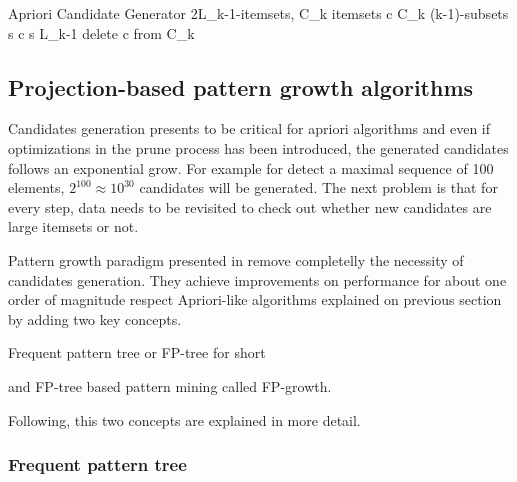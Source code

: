 \begin{pseudocode}{Apriori Candidate Generator 2}{L_{k-1}-itemsets, C_{k}}
\label{pc:apriori_candidate_generator2}
    \FORALL itemsets \quad c \in C_{k} \DO
    \BEGIN
        \FORALL (k-1)-subsets \quad s \in c \DO
        \BEGIN
            \IF s \not\in  L_{k-1} \THEN
                delete \quad c \quad from \quad C_{k}\\
        \END
    \END
\end{pseudocode}


\subsection{Projection-based pattern growth
algorithms}\label{ss:projection_based}

Candidates generation presents to be critical for apriori algorithms and even if
optimizations in the prune process has been introduced, the generated candidates
follows an exponential grow. For example for detect a maximal sequence of 100
elements, $2^{100} \approx 10^{30}$ candidates will be generated. The next
problem is that for every step, data needs to be revisited to check out whether 
new candidates are large itemsets or not. 

Pattern growth paradigm presented in \cite{han2000mining1} remove
completelly the necessity of candidates generation. They achieve improvements on
performance for about one order of magnitude respect Apriori-like algorithms
explained on previous section by adding two key concepts. 
\begin{enumerate*}[label=(\roman*)]
  \item Frequent pattern tree or FP-tree for short
  \item and FP-tree based pattern mining called FP-growth.
\end{enumerate*}
Following, this two concepts are explained in more detail.

\subsubsection{Frequent pattern tree}\label{ss:frequent_pattern_tree}

